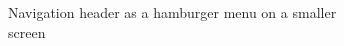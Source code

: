 \begin{figure}[h!]
    \centering
    \begin{subfigure}[h!]{0.4\linewidth}
        \centering
        \caption{Navigation header as a hamburger menu on a smaller screen}
        \label{fig:navigation-header}
    \end{subfigure}
    \hfill
    \begin{subfigure}[h!]{0.4\linewidth}
        \centering

\end{subfigure}
\end{figure}
